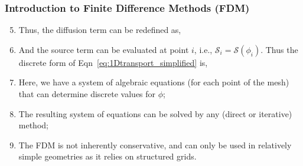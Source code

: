 \documentclass[10pt,compress]{beamer}
\begin{document}
\begin{frame}
  \frametitle{Introduction to Finite Difference Methods (FDM)}
\begin{enumerate}
   \setcounter{enumi}{4}
  \item <1-> Thus, the diffusion term can be redefined as,
  \item <2-> And the source term can be evaluated at point $i$, i.e., $\mathcal{S}_{i}=\mathcal{S}\left(\phi_{i}\right)$. Thus the discrete form of Eqn~\ref{eq:1Dtransport_simplified} is,
  \item <3-> Here, we have a system of algebraic equations (for each point of the mesh) that can determine discrete values for $\phi$;
  \item <4-> The resulting system of equations can be solved by any (direct or iterative) method;
  \item <5-> The FDM is not inherently conservative, and can only be used in relatively simple geometries as it relies on structured grids.
\end{enumerate}  
 
\end{frame}
\end{document}
